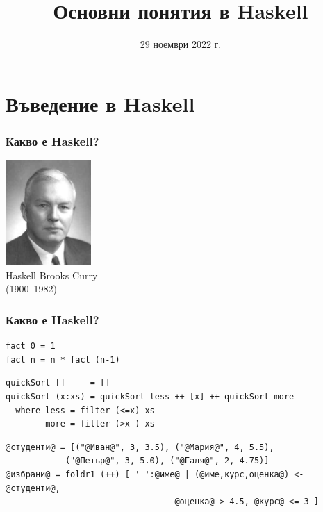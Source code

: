 \documentclass[alsotrans]{beamerswitch}
\title{Основни понятия в Haskell}
\date{29 ноември 2022 г.}
\begin{document}
\begin{frame}
  \titlepage
\end{frame}

\section{Въведение в Haskell}

\begin{frame}
  \frametitle{Какво е Haskell?}

  \pause
  \begin{center}
    \includegraphics[height=4cm]{images/HaskellBCurry.jpg}\\
    Haskell Brooks Curry\\
    (1900--1982)\\[5ex]
  \end{center}
\end{frame}

\lstset{basicstyle=\small\ttfamily}

\begin{frame}[fragile]
  \frametitle{Какво е Haskell?}

  \pause
\begin{lstlisting}
fact 0 = 1
fact n = n * fact (n-1)
\end{lstlisting}
  \pause
\begin{lstlisting}
quickSort []     = []
quickSort (x:xs) = quickSort less ++ [x] ++ quickSort more
  where less = filter (<=x) xs
        more = filter (>x ) xs
\end{lstlisting}
  \pause
\begin{lstlisting}
@студенти@ = [("@Иван@", 3, 3.5), ("@Мария@", 4, 5.5),
            ("@Петър@", 3, 5.0), ("@Галя@", 2, 4.75)]
@избрани@ = foldr1 (++) [ ' ':@име@ | (@име,курс,оценка@) <- @студенти@,
                                  @оценка@ > 4.5, @курс@ <= 3 ]
\end{lstlisting}
\end{frame}
\end{document}
